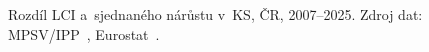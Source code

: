 \def\strStavIppMezeraCaption{\centering Rozdíl LCI a~sjednaného nárůstu v~KS, ČR, 2007–2025. Zdroj dat: MPSV/IPP~\cite{mpsv_ipp}, Eurostat~\cite{eurostat_lci}.}%
%
\begin{figure}[htbp]
  \centering
  \resizebox{\linewidth}{!}{}
  \caption{\strStavIppMezeraCaption}
  \label{fig:stav_ipp_mezera}
\end{figure}
